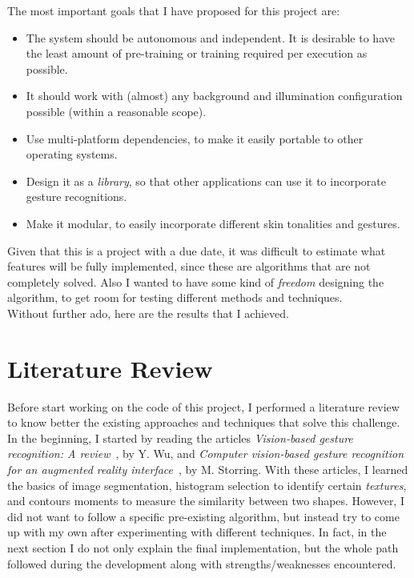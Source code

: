 \documentclass[11pt,a4paper]{article}
\begin{document}
The most important goals that I have proposed for this project are:
\begin{itemize}
\item The system should be autonomous and independent. It is desirable to have the least amount of pre-training or training required per execution as possible.
\item It should work with (almost) any background and illumination configuration possible (within a reasonable scope).
\item Use multi-platform dependencies, to make it easily portable to other operating systems.
\item Design it as a \textit{library}, so that other applications can use it to incorporate gesture recognitions.
\item Make it modular, to easily incorporate different skin tonalities and gestures.
\end{itemize}
 
Given that this is a project with a due date, it was difficult to estimate what features will be fully implemented, since these are algorithms that are not completely solved. Also I wanted to have some kind of \textit{freedom} designing the algorithm, to get room for testing different methods and techniques.\\

Without further ado, here are the results that I achieved.\\


\section{Literature Review}

Before start working on the code of this project, I performed a literature review to know better the existing approaches and techniques that solve this challenge.\\

In the beginning, I started by reading the articles \textit{Vision-based gesture recognition: A review}~\cite{wu1999vision}, by Y. Wu, and \textit{Computer vision-based gesture recognition for an augmented reality interface}~\cite{storring2004computer}, by M. Storring. With these articles, I learned the basics of image segmentation, histogram selection to identify certain \textit{textures}, and contours moments to measure the similarity between two shapes. However, I did not want to follow a specific  pre-existing algorithm, but instead try to come up with my own after experimenting with different techniques. In fact, in the next section I do not only explain the final implementation, but the whole path followed during the development along with strengths/weaknesses encountered.\\
\end{document}
